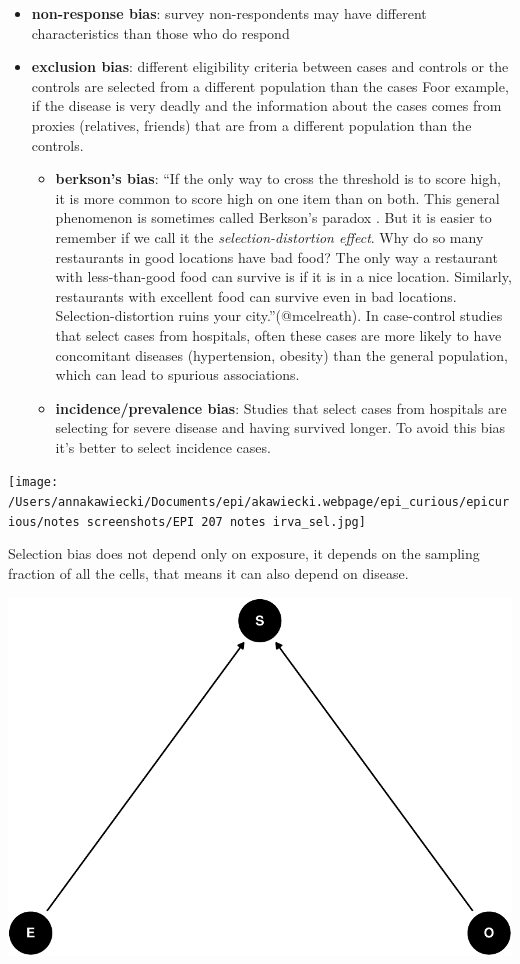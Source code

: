 \documentclass[
]{article}
\begin{document}
\begin{itemize}
\item
  \textbf{non-response bias}: survey non-respondents may have different
  characteristics than those who do respond
\item
  \textbf{exclusion bias}: different eligibility criteria between cases
  and controls or the controls are selected from a different population
  than the cases Foor example, if the disease is very deadly and the
  information about the cases comes from proxies (relatives, friends)
  that are from a different population than the controls.

  \begin{itemize}
  \item
    \textbf{berkson's bias}: ``If the only way to cross the threshold is
    to score high, it is more common to score high on one item than on
    both. This general phenomenon is sometimes called Berkson's paradox
    . But it is easier to remember if we call it the
    \emph{selection-distortion effect}. Why do so many restaurants in
    good locations have bad food? The only way a restaurant with
    less-than-good food can survive is if it is in a nice location.
    Similarly, restaurants with excellent food can survive even in bad
    locations. Selection-distortion ruins your city.''(@mcelreath). In
    case-control studies that select cases from hospitals, often these
    cases are more likely to have concomitant diseases (hypertension,
    obesity) than the general population, which can lead to spurious
    associations.
  \item
    \textbf{incidence/prevalence bias}: Studies that select cases from
    hospitals are selecting for severe disease and having survived
    longer. To avoid this bias it's better to select incidence cases.
  \end{itemize}
\end{itemize}

\texttt{[image: /Users/annakawiecki/Documents/epi/akawiecki.webpage/epi\_curious/epicurious/notes screenshots/EPI 207 notes irva\_sel.jpg]}

Selection bias does not depend only on exposure, it depends on the
sampling fraction of all the cells, that means it can also depend on
disease.

\includegraphics{index_files/figure-latex/dag selection bias-1.pdf}
\end{document}
